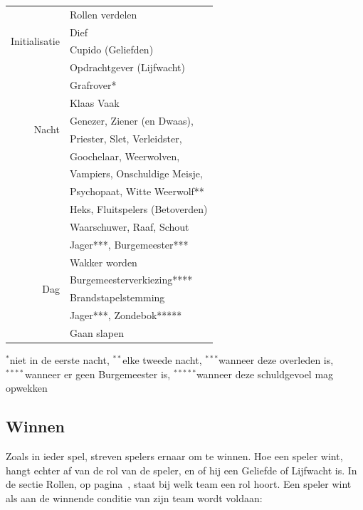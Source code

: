\documentclass[12pt]{article}
\begin{document}
    \begin{center}
      \begin{tabular}{r|l}
	\multirow{4}{*}{Initialisatie} & Rollen verdelen \\ \cline{2-2}
	 & Dief \\ \cline{2-2}
	 & Cupido (Geliefden) \\ \cline{2-2}
	 & Opdrachtgever (Lijfwacht) \\
	\hline
	\hline
	\multirow{6}{*}{Nacht} & Grafrover* \\ \cline{2-2}
	 & Klaas Vaak \\ \cline{2-2}
	 & Genezer, Ziener (en Dwaas), \\
	 & Priester, Slet, Verleidster, \\
	 & Goochelaar, Weerwolven, \\
	 & Vampiers, Onschuldige Meisje, \\
	 & Psychopaat, Witte Weerwolf** \\ \cline{2-2}
	 & Heks, Fluitspelers (Betoverden)\\ \cline{2-2}
	 & Waarschuwer, Raaf, Schout \\ \cline{2-2}
	 & Jager***, Burgemeester*** \\
	\hline
	\multirow{4}{*}{Dag} & Wakker worden \\ \cline{2-2}
	 & Burgemeesterverkiezing**** \\ \cline{2-2}
	 & Brandstapelstemming \\ \cline{2-2}
	 & Jager***, Zondebok***** \\ \cline{2-2}
	 & Gaan slapen \\
      \end{tabular}
      
      {\scriptsize \noindent $^{\ast}$niet in de eerste nacht, 
      $^{\ast\ast}$elke tweede nacht, 
      $^{\ast\ast\ast}$wanneer deze overleden is, \\
      $^{\ast\ast\ast\ast}$wanneer er geen Burgemeester is,
      $^{\ast\ast\ast\ast\ast}$wanneer deze schuldgevoel mag opwekken}
      
    \end{center}
    
  \subsection{Winnen} \label{subsec:winnen}
  
    Zoals in ieder spel, streven spelers ernaar om te winnen. Hoe een speler wint, hangt echter af van de rol van de speler, en of hij een Geliefde of Lijfwacht is. In de sectie Rollen, op pagina~\pageref{subsec:rollen}, staat bij welk team een rol hoort. Een speler wint als aan de winnende conditie van zijn team wordt voldaan:
    
\end{document}
